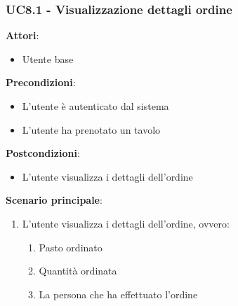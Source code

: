\subsubsection{UC8.1 - Visualizzazione dettagli ordine}\label{usecase:8_1}
\textbf{Attori}:
\begin{itemize}
    \item Utente base
\end{itemize}
\textbf{Precondizioni}:
\begin{itemize}
    \item L'utente è autenticato dal sistema
    \item L'utente ha prenotato un tavolo
\end{itemize}
\textbf{Postcondizioni}:
\begin{itemize}
    \item L'utente visualizza i dettagli dell'ordine
\end{itemize}
\textbf{Scenario principale}:
\begin{enumerate}
    \item L'utente visualizza i dettagli dell'ordine, ovvero:
    \begin{enumerate}
        \item Pasto ordinato
        \item Quantità ordinata
        \item La persona che ha effettuato l'ordine
    \end{enumerate}
\end{enumerate}
\newpage
